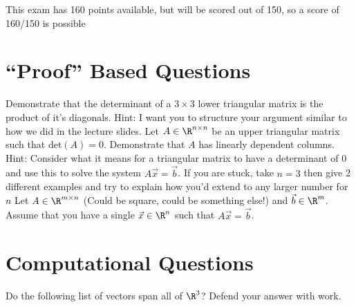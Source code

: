 \documentclass[12pt,addpoints]{exam}
\begin{document}
    This exam has 160 points available, but will be scored out of 150, so a score of 160/150 is possible
    \vfill
    \begin{center}
        \gradetable[h]
    \end{center}
    \newpage
    \begin{questions}
        \section*{``Proof'' Based Questions}
        \question[15] Demonstrate that the determinant of a $3\times 3$ lower triangular matrix is the
        product of it's diagonals. Hint: I want you to structure your argument similar to how we did
        in the lecture slides.
        \vspace{200pt}
        \question[15] Let $A\in\R^{n\times n}$ be an upper triangular matrix such that $\text{det}(A)=0$.
        Demonstrate that $A$ has linearly dependent columns. Hint: Consider what it means for a triangular matrix
        to have a determinant of $0$ and use this to solve the system $A\vec{x}=\vec{b}$. If you are stuck,
        take $n=3$ then give 2 different examples and try to explain how you'd extend to any larger
        number for $n$
        \vfill
        \newpage
        \question[20] Let $A\in\R^{m\times n}$ (Could be square, could be something else!) and
        $\vec{b}\in\R^{m}$. Assume that you have a single $\vec{x}\in\R^{n}$ such that $A\vec{x} = \vec{b}$.

        \section*{Computational Questions}
        \question[15] Do the following list of vectors span all of $\R^3$? Defend your answer with work.


\end{questions}
\end{document}
